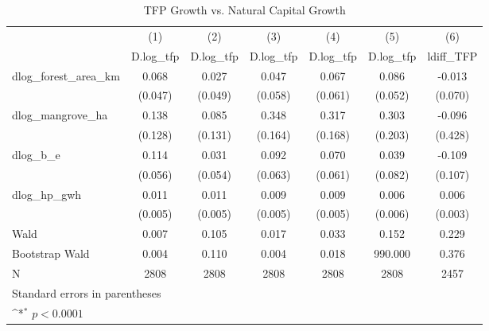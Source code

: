 \begin{table}[htbp]\centering
\def\sym#1{\ifmmode^{#1}\else\(^{#1}\)\fi}
\caption{TFP Growth vs. Natural Capital Growth}
\begin{tabular}{l*{6}{c}}
\hline\hline
            &\multicolumn{1}{c}{(1)}&\multicolumn{1}{c}{(2)}&\multicolumn{1}{c}{(3)}&\multicolumn{1}{c}{(4)}&\multicolumn{1}{c}{(5)}&\multicolumn{1}{c}{(6)}\\
            &\multicolumn{1}{c}{D.log\_tfp}&\multicolumn{1}{c}{D.log\_tfp}&\multicolumn{1}{c}{D.log\_tfp}&\multicolumn{1}{c}{D.log\_tfp}&\multicolumn{1}{c}{D.log\_tfp}&\multicolumn{1}{c}{ldiff\_TFP}\\
\hline
dlog\_forest\_area\_km&       0.068       &       0.027       &       0.047       &       0.067       &       0.086       &      -0.013       \\
            &     (0.047)       &     (0.049)       &     (0.058)       &     (0.061)       &     (0.052)       &     (0.070)       \\
[1em]
dlog\_mangrove\_ha&       0.138       &       0.085       &       0.348       &       0.317       &       0.303       &      -0.096       \\
            &     (0.128)       &     (0.131)       &     (0.164)       &     (0.168)       &     (0.203)       &     (0.428)       \\
[1em]
dlog\_b\_e    &       0.114       &       0.031       &       0.092       &       0.070       &       0.039       &      -0.109       \\
            &     (0.056)       &     (0.054)       &     (0.063)       &     (0.061)       &     (0.082)       &     (0.107)       \\
[1em]
dlog\_hp\_gwh &       0.011       &       0.011       &       0.009       &       0.009       &       0.006       &       0.006       \\
            &     (0.005)       &     (0.005)       &     (0.005)       &     (0.005)       &     (0.006)       &     (0.003)       \\
\hline
Wald        &       0.007       &       0.105       &       0.017       &       0.033       &       0.152       &       0.229       \\
Bootstrap Wald&       0.004       &       0.110       &       0.004       &       0.018       &     990.000       &       0.376       \\
N           &        2808       &        2808       &        2808       &        2808       &        2808       &        2457       \\
\hline\hline
\multicolumn{7}{l}{\footnotesize Standard errors in parentheses}\\
\multicolumn{7}{l}{\footnotesize \sym{*} \(p<0.0001\)}\\
\end{tabular}
\end{table}
